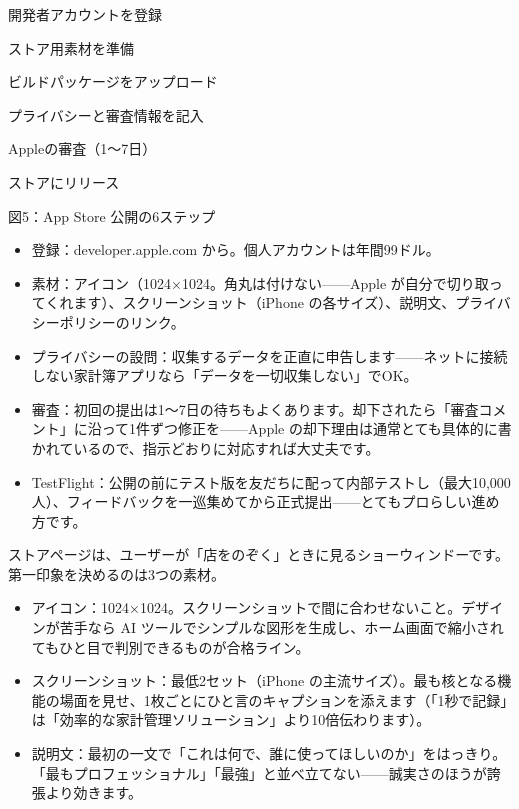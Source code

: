 
開発者アカウントを登録

ストア用素材を準備

ビルドパッケージをアップロード

プライバシーと審査情報を記入

Appleの審査（1〜7日）

ストアにリリース

\begin{center}\small\color{gray}図5：App Store 公開の6ステップ\end{center}

\begin{itemize}
  \item 登録：developer.apple.com から。個人アカウントは年間99ドル。
  \item 素材：アイコン（1024×1024。角丸は付けない——Apple が自分で切り取ってくれます）、スクリーンショット（iPhone の各サイズ）、説明文、プライバシーポリシーのリンク。
  \item プライバシーの設問：収集するデータを正直に申告します——ネットに接続しない家計簿アプリなら「データを一切収集しない」でOK。
  \item 審査：初回の提出は1〜7日の待ちもよくあります。却下されたら「審査コメント」に沿って1件ずつ修正を——Apple の却下理由は通常とても具体的に書かれているので、指示どおりに対応すれば大丈夫です。
  \item TestFlight：公開の前にテスト版を友だちに配って内部テストし（最大10,000人）、フィードバックを一巡集めてから正式提出——とてもプロらしい進め方です。
\end{itemize}


ストアページは、ユーザーが「店をのぞく」ときに見るショーウィンドーです。第一印象を決めるのは3つの素材。

\begin{itemize}
  \item アイコン：1024×1024。スクリーンショットで間に合わせないこと。デザインが苦手なら AI ツールでシンプルな図形を生成し、ホーム画面で縮小されてもひと目で判別できるものが合格ライン。
  \item スクリーンショット：最低2セット（iPhone の主流サイズ）。最も核となる機能の場面を見せ、1枚ごとにひと言のキャプションを添えます（「1秒で記録」は「効率的な家計管理ソリューション」より10倍伝わります）。
  \item 説明文：最初の一文で「これは何で、誰に使ってほしいのか」をはっきり。「最もプロフェッショナル」「最強」と並べ立てない——誠実さのほうが誇張より効きます。
\end{itemize}

